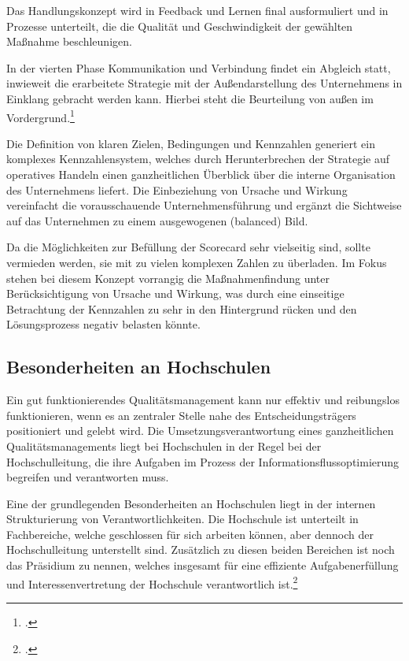 Das Handlungskonzept wird in \glqq Feedback und Lernen\grqq{} final ausformuliert und in Prozesse 
unterteilt, die die Qualität und Geschwindigkeit der gewählten Maßnahme beschleunigen.

In der vierten Phase \glqq Kommunikation und Verbindung\grqq{} findet ein Abgleich statt, inwieweit die 
erarbeitete Strategie mit der Außendarstellung des Unternehmens in Einklang gebracht werden kann. Hierbei 
steht die Beurteilung von außen im Vordergrund.\footcite[35 ff.]{kaufmann_feinschliff_2002}

Die Definition von klaren Zielen, Bedingungen und Kennzahlen generiert ein komplexes Kennzahlensystem, 
welches durch Herunterbrechen der Strategie auf operatives Handeln einen ganzheitlichen Überblick über die 
interne Organisation des Unternehmens liefert. Die Einbeziehung von Ursache und Wirkung vereinfacht die 
vorausschauende Unternehmensführung und ergänzt die Sichtweise auf das Unternehmen zu einem 
ausgewogenen (balanced) Bild. 

Da die Möglichkeiten zur Befüllung der Scorecard sehr vielseitig sind, sollte vermieden werden, sie mit zu 
vielen komplexen Zahlen zu überladen. Im Fokus stehen bei diesem Konzept vorrangig die 
Maßnahmenfindung unter Berücksichtigung von Ursache und Wirkung, was durch eine einseitige Betrachtung 
der Kennzahlen zu sehr in den Hintergrund rücken und den Lösungsprozess negativ belasten könnte.

\subsection{Besonderheiten an Hochschulen}
Ein gut funktionierendes Qualitätsmanagement kann nur effektiv und reibungslos funktionieren, wenn es an zentraler Stelle nahe des Entscheidungsträgers positioniert und gelebt wird.
Die Umsetzungsverantwortung eines ganzheitlichen Qualitätsmanagements liegt bei Hochschulen in der 
Regel bei der Hochschulleitung, die ihre Aufgaben im Prozess der Informationsflussoptimierung begreifen 
und verantworten muss.

Eine der grundlegenden Besonderheiten an Hochschulen liegt in der internen Strukturierung von Verantwortlichkeiten. Die Hochschule ist unterteilt in Fachbereiche, welche geschlossen für sich arbeiten können, aber dennoch der Hochschulleitung unterstellt sind. Zusätzlich zu diesen beiden Bereichen ist noch das Präsidium zu nennen, welches insgesamt für eine effiziente Aufgabenerfüllung und Interessenvertretung der Hochschule verantwortlich ist.\footcite[353 ff.]{mintzberg_1992}

